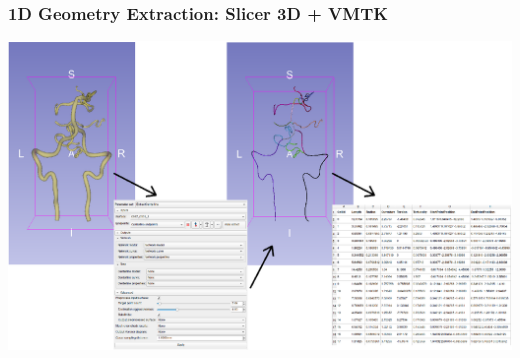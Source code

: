 \documentclass{beamer}
\begin{document}
\begin{frame}
\begin{figure}[htbp]
\begin{minipage}[c][0.35\paperheight][c]{\linewidth}
\begin{minipage}{0.19\linewidth}
			\end{minipage}
			\begin{minipage}{0.1\linewidth}
				\caption*{\tiny}
			\end{minipage}
		\end{minipage}
	\end{figure}
\end{frame}

\begin{frame}
	\frametitle{1D Geometry Extraction: Slicer 3D + VMTK}
	\begin{center}
		\includegraphics[width=\textwidth]{images/0053_extract.eps}
	\end{center}
\end{frame}
\end{document}
